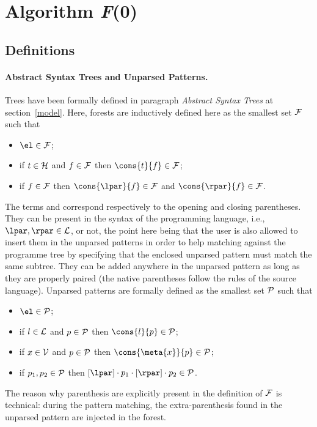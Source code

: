
\section{Algorithm \textit{F}(0)}
\label{f0}

\subsection{Definitions}

\paragraph{Abstract Syntax Trees and Unparsed Patterns.}

Trees have been formally defined in paragraph \emph{Abstract Syntax
  Trees} at section~\ref{model}. Here, forests are inductively defined
here as the smallest set \(\cal F\) such that
\begin{itemize}

  \item \(\el \in {\cal F}\);

  \item if \(t \in {\cal H}\) and \(f \in {\cal F}\) then
    \(\cons{t}{f} \in {\cal F}\);

  \item if \(f \in {\cal F}\) then \(\cons{\lpar}{f} \in {\cal F}\) and
    \(\cons{\rpar}{f} \in {\cal F}\).

\end{itemize}
The terms \lpar and \lpar correspond respectively to the opening and
closing parentheses. They can be present in the syntax of the
programming language, i.e., \(\lpar, \rpar \in {\cal L}\), or not, the
point here being that the user is also allowed to insert them in the
unparsed patterns in order to help matching against the programme tree
by specifying that the enclosed unparsed pattern must match the same
subtree. They can be added anywhere in the unparsed pattern as long as
they are properly paired (the native parentheses follow the rules of
the source language). Unparsed patterns are formally defined as the
smallest set \(\cal P\) such that
\begin{itemize}

  \item \(\el \in {\cal P}\);

  \item if \(l \in {\cal L}\) and \(p \in {\cal P}\) then
    \(\cons{l}{p} \in {\cal P}\);

  \item if \(x \in {\cal V}\) and \(p \in {\cal P}\) then
    \(\cons{\meta{x}}{p} \in {\cal P}\);

  \item if \(p_1, p_2 \in {\cal P}\) then \([\lpar] \cdot p_1 \cdot
    [\rpar] \cdot p_2 \in {\cal P}\).

\end{itemize}
The reason why parenthesis are explicitly present in the definition of
\(\cal F\) is technical: during the pattern matching, the
extra\hyp{}parenthesis found in the unparsed pattern are injected in
the forest.



